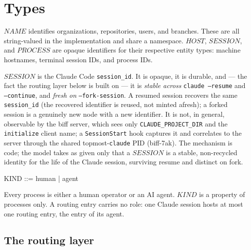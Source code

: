 \documentclass[a4paper,10pt,fleqn]{article}
\begin{document}
\section{Types}

\begin{zed}
\end{zed}

$NAME$ identifies organizations, repositories, users, and branches.
These are all string-valued in the implementation and share a namespace.
$HOST$, $SESSION$, and $PROCESS$ are opaque identifiers for their
respective entity types: machine hostnames, terminal session IDs, and
process IDs.

\medskip\noindent
$SESSION$ is the Claude Code \texttt{session\_id}.  It is opaque, it is
durable, and --- the fact the routing layer below is built on --- it is
\emph{stable across} \texttt{claude --resume} and \texttt{--continue},
and \emph{fresh on} \texttt{--fork-session}.  A resumed session recovers
the same \texttt{session\_id} (the recovered identifier is reused, not
minted afresh); a forked session is a genuinely new node with a new
identifier.  It is not, in general, observable by the biff server, which
sees only \texttt{CLAUDE\_PROJECT\_DIR} and the \texttt{initialize}
client name; a \texttt{SessionStart} hook captures it and correlates to
the server through the shared topmost-\texttt{claude} PID (biff-7ak).
The mechanism is code; the model takes as given only that a $SESSION$ is
a stable, non-recycled identity for the life of the Claude session,
surviving resume and distinct on fork.

\begin{zed}
  KIND ::= human | agent
\end{zed}

Every process is either a human operator or an AI agent.  $KIND$ is a
property of processes only.  A routing entry carries no role: one Claude
session hosts at most one routing entry, the entry of its agent.

\subsection{The routing layer}
\end{document}
